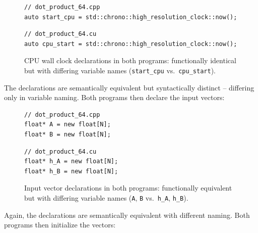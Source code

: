 \documentclass{article}
\begin{document}
\begin{figure}[H]
\noindent%
\begin{minipage}[t]{0.48\textwidth}
\begin{verbatim}
// dot_product_64.cpp
auto start_cpu = std::chrono::high_resolution_clock::now();
\end{verbatim}
\end{minipage}%
\hfill%
\begin{minipage}[t]{0.48\textwidth}
\begin{verbatim}
// dot_product_64.cu
auto cpu_start = std::chrono::high_resolution_clock::now();
\end{verbatim}
\end{minipage}
    \caption{CPU wall clock declarations in both programs: functionally identical but with differing variable names (\texttt{start\_cpu} vs.\ \texttt{cpu\_start}).}
    \label{fig:wall_clock_decl}
\end{figure}

The declarations are semantically equivalent but syntactically distinct -- differing only in variable naming. Both programs then declare the input vectors:

\begin{figure}[H]
\noindent%
\begin{minipage}[t]{0.48\textwidth}
\begin{verbatim}
// dot_product_64.cpp
float* A = new float[N];
float* B = new float[N];
\end{verbatim}
\end{minipage}%
\hfill%
\begin{minipage}[t]{0.48\textwidth}
\begin{verbatim}
// dot_product_64.cu
float* h_A = new float[N];
float* h_B = new float[N];
\end{verbatim}
\end{minipage}
    \caption{Input vector declarations in both programs: functionally equivalent but with differing variable names (\texttt{A}, \texttt{B} vs.\ \texttt{h\_A}, \texttt{h\_B}).}
    \label{fig:vector_decl}
\end{figure}

Again, the declarations are semantically equivalent with different naming. Both programs then initialize the vectors:
\end{document}
